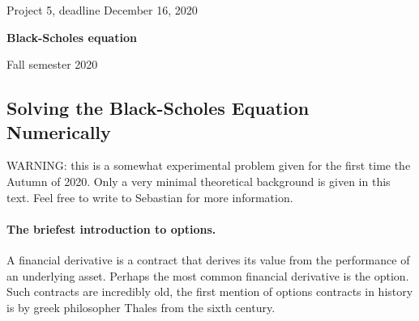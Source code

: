 \documentclass[%
oneside,                 %
final,                   %
10pt]{article}
\begin{document}

\newcommand{\exercisesection}[1]{\subsection*{#1}}






\thispagestyle{empty}

\begin{center}
{\LARGE\bf
\begin{spacing}{1.25}
Project 5, deadline  December 16, 2020
\end{spacing}
}
\end{center}


\begin{center}
{\bf Black-Scholes equation${}^{}$} \\ [0mm]
\end{center}

\begin{center}
\end{center}
    

\begin{center}
Fall semester 2020
\end{center}

\vspace{1cm}


\subsection*{Solving the Black-Scholes Equation Numerically}

WARNING: this is a somewhat experimental problem given for the 
first time the Autumn of 2020. Only a very minimal theoretical 
background is given in this text. Feel free to write to Sebastian for more information.

\paragraph{The briefest introduction to options.}
A financial derivative is a contract that derives its value from 
the performance of an underlying asset. Perhaps the most common 
financial derivative is the option. Such contracts are 
incredibly old, the first mention of options contracts in 
history is by greek philosopher Thales from the sixth century.
\end{document}

